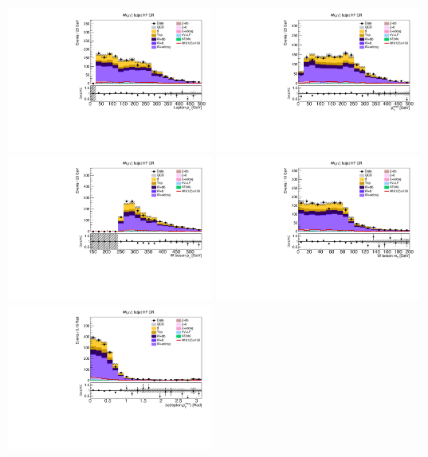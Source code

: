 \begin{figure}[tbp]
  \begin{center}
    \includegraphics[width=0.48\textwidth]{figures/wlnhbb2016/boosted/WmnWHHeavyFlavorFJCR_lepton1Pt.pdf}
    \includegraphics[width=0.48\textwidth]{figures/wlnhbb2016/boosted/WmnWHHeavyFlavorFJCR_pfmet.pdf}
    \includegraphics[width=0.48\textwidth]{figures/wlnhbb2016/boosted/WmnWHHeavyFlavorFJCR_topWBosonPt.pdf}
    \includegraphics[width=0.48\textwidth]{figures/wlnhbb2016/boosted/WmnWHHeavyFlavorFJCR_mT.pdf}
    \includegraphics[width=0.48\textwidth]{figures/wlnhbb2016/boosted/WmnWHHeavyFlavorFJCR_deltaPhiLep1Met.pdf}

\end{center}
\end{figure}

